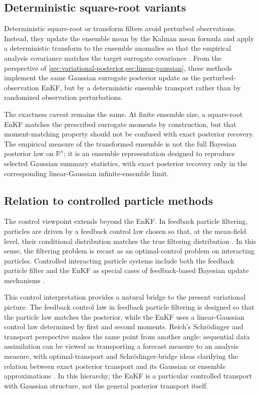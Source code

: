 \documentclass[11pt]{article}
\newcommand{\R}{\mathbb{R}}
\numberwithin{equation}{section}
\theoremstyle{plain}
\theoremstyle{definition}
\theoremstyle{remark}
\begin{document}
\subsection{Deterministic square-root variants}

Deterministic square-root or transform filters avoid perturbed observations. Instead, they update the ensemble mean by the Kalman mean formula and apply a deterministic transform to the ensemble anomalies so that the empirical analysis covariance matches the target surrogate covariance \citep{whitakerhamill2002,tippett2003}. From the perspective of \cref{sec:variational-posterior,sec:linear-gaussian}, these methods implement the same Gaussian surrogate posterior update as the perturbed-observation EnKF, but by a deterministic ensemble transport rather than by randomized observation perturbations.

The exactness caveat remains the same. At finite ensemble size, a square-root EnKF matches the prescribed surrogate moments by construction, but that moment-matching property should not be confused with exact posterior recovery. The empirical measure of the transformed ensemble is not the full Bayesian posterior law on $\R^n$; it is an ensemble representation designed to reproduce selected Gaussian summary statistics, with exact posterior recovery only in the corresponding linear-Gaussian infinite-ensemble limit.

\subsection{Relation to controlled particle methods}
\label{subsec:controlled-particle}

The control viewpoint extends beyond the EnKF. In feedback particle filtering, particles are driven by a feedback control law chosen so that, at the mean-field level, their conditional distribution matches the true filtering distribution \citep{yang2013}. In this sense, the filtering problem is recast as an optimal-control problem on interacting particles. Controlled interacting particle systems include both the feedback particle filter and the EnKF as special cases of feedback-based Bayesian update mechanisms \citep{taghvaeimehta2023}.

This control interpretation provides a natural bridge to the present variational picture. The feedback control law in feedback particle filtering is designed so that the particle law matches the posterior, while the EnKF uses a linear-Gaussian control law determined by first and second moments. Reich's Schr\"odinger and transport perspective makes the same point from another angle: sequential data assimilation can be viewed as transporting a forecast measure to an analysis measure, with optimal-transport and Schr\"odinger-bridge ideas clarifying the relation between exact posterior transport and its Gaussian or ensemble approximations \citep{reich2019}. In this hierarchy, the EnKF is a particular controlled transport with Gaussian structure, not the general posterior transport itself.
\end{document}
